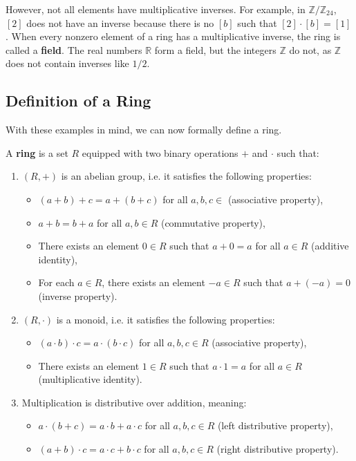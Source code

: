 However, not all elements have multiplicative inverses. For example, in $\mathbb{Z}/\mathbb{Z}_{24}$, \([2]\) does not have an inverse because there is no \([b]\) such that \([2] \cdot [b] = [1]\). When every nonzero element of a ring has a multiplicative inverse, the ring is called a \textbf{field}. The real numbers \(\mathbb{R}\) form a field, but the integers \(\mathbb{Z}\) do not, as \(\mathbb{Z}\) does not contain inverses like \(1/2\).

\subsection{Definition of a Ring}

With these examples in mind, we can now formally define a ring.

\begin{definition}
    A \textbf{ring} is a set $R$ equipped with two binary operations $+$ and $\cdot$ such that:
    \begin{enumerate}
        \item $(R, +)$ is an abelian group, i.e. it satisfies the following properties:
        \begin{itemize}
            \item $(a+b)+c = a+(b+c)$ for all $a,b,c\in $ (associative property),
            \item $a+b = b+a$ for all $a,b\in R$ (commutative property),
            \item There exists an element $0\in R$ such that $a+0 = a$ for all $a\in R$ (additive identity),
            \item For each $a\in R$, there exists an element $-a\in R$ such that $a+(-a) = 0$ (inverse property).
        \end{itemize}
        \item $(R, \cdot)$ is a monoid, i.e. it satisfies the following properties:
        \begin{itemize}
            \item $(a\cdot b)\cdot c = a\cdot (b\cdot c)$ for all $a,b,c\in R$ (associative property),
            \item There exists an element $1\in R$ such that $a\cdot 1 = a$ for all $a\in R$ (multiplicative identity).
        \end{itemize}
        \item Multiplication is distributive over addition, meaning:
        \begin{itemize}
            \item $a\cdot (b+c) = a\cdot b + a\cdot c$ for all $a,b,c\in R$ (left distributive property),
            \item $(a+b)\cdot c = a\cdot c + b\cdot c$ for all $a,b,c\in R$ (right distributive property).
        \end{itemize}
    \end{enumerate}
\end{definition}

